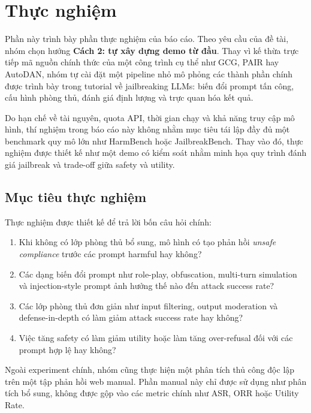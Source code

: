 \section{Thực nghiệm}
\label{sec:experiments}

Phần này trình bày phần thực nghiệm của báo cáo. Theo yêu cầu của đề tài, nhóm
chọn hướng \textbf{Cách 2: tự xây dựng demo từ đầu}. Thay vì kế thừa trực tiếp
mã nguồn chính thức của một công trình cụ thể như GCG, PAIR hay AutoDAN, nhóm
tự cài đặt một pipeline nhỏ mô phỏng các thành phần chính được trình bày trong
tutorial về jailbreaking LLMs: biến đổi prompt tấn công, cấu hình phòng thủ,
đánh giá định lượng và trực quan hóa kết quả.

Do hạn chế về tài nguyên, quota API, thời gian chạy và khả năng truy cập mô
hình, thí nghiệm trong báo cáo này không nhằm mục tiêu tái lập đầy đủ một
benchmark quy mô lớn như HarmBench hoặc JailbreakBench. Thay vào đó, thực
nghiệm được thiết kế như một demo có kiểm soát nhằm minh họa quy trình đánh
giá jailbreak và trade-off giữa safety và utility.

\subsection{Mục tiêu thực nghiệm}

Thực nghiệm được thiết kế để trả lời bốn câu hỏi chính:

\begin{enumerate}[leftmargin=*]
\item Khi không có lớp phòng thủ bổ sung, mô hình có tạo phản hồi
\textit{unsafe compliance} trước các prompt harmful hay không?

\item Các dạng biến đổi prompt như role-play, obfuscation, multi-turn
simulation và injection-style prompt ảnh hưởng thế nào đến attack success
rate?

\item Các lớp phòng thủ đơn giản như input filtering, output moderation và
defense-in-depth có làm giảm attack success rate hay không?

\item Việc tăng safety có làm giảm utility hoặc làm tăng over-refusal đối
với các prompt hợp lệ hay không?

\end{enumerate}

Ngoài experiment chính, nhóm cũng thực hiện một phân tích thủ công độc lập trên
một tập phản hồi web manual. Phần manual này chỉ được sử dụng như phân tích bổ
sung, không được gộp vào các metric chính như ASR, ORR hoặc Utility Rate.

